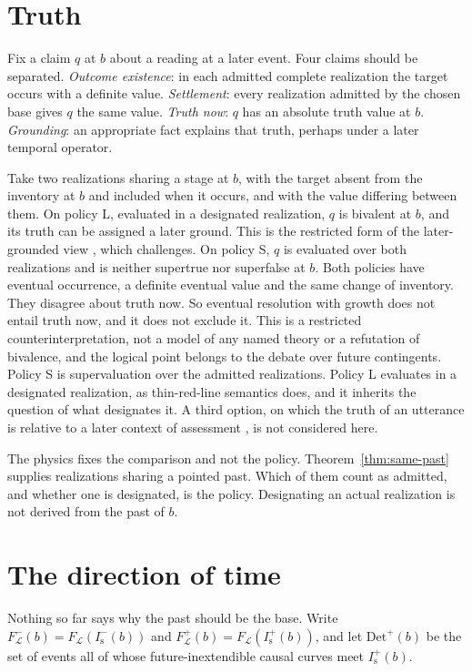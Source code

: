 \documentclass[11pt]{article}
\theoremstyle{definition}
\newcommand{\Is}{I^-_{\mathrm s}}
\newcommand{\Isp}{I^+_{\mathrm s}}
\newcommand{\Det}{\mathrm{Det}}
\begin{document}
\section{Truth}\label{sec:truth}

Fix a claim $q$ at $b$ about a reading at a later event. Four claims should be separated. \emph{Outcome
existence}: in each admitted complete realization the target occurs with a definite value.
\emph{Settlement}: every realization admitted by the chosen base gives $q$ the same value. \emph{Truth now}:
$q$ has an absolute truth value at $b$. \emph{Grounding}: an appropriate fact explains that truth, perhaps
under a later temporal operator.

Take two realizations sharing a stage at $b$, with the target absent from the inventory at $b$ and included
when it occurs, and with the value differing between them. On policy L, evaluated in a designated realization,
$q$ is bivalent at $b$, and its truth can be assigned a later ground. This is the restricted form of the later-grounded view \citep{CR2018}, which \citet{Wawer2021} challenges. On policy S, $q$ is evaluated over both realizations and is neither
supertrue nor superfalse at $b$. Both policies have eventual occurrence, a definite eventual value and the
same change of inventory. They disagree about truth now. So eventual resolution with growth does not entail
truth now, and it does not exclude it. This is a restricted counterinterpretation, not a model of any named
theory or a refutation of bivalence, and the logical point belongs to the debate over future contingents. Policy S is supervaluation over the
admitted realizations. Policy L evaluates in a designated realization, as thin-red-line semantics does, and it
inherits the question of what designates it. A third option, on which the truth of an utterance is relative to
a later context of assessment \citep{MacFarlane2003}, is not considered here.

The physics fixes the comparison and not the policy. Theorem~\ref{thm:same-past} supplies realizations sharing a
pointed past. Which of them count as admitted, and whether one is designated, is the policy. Designating an
actual realization is not derived from the past of $b$.

\section{The direction of time}\label{sec:direction}

Nothing so far says why the past should be the base. Write $F^-_{\mathcal L}(b)=F_{\mathcal L}(\Is(b))$ and $F^+_{\mathcal L}(b)=F_{\mathcal L}(\Isp(b))$, and let $\Det^+(b)$ be the set of events all of whose future-inextendible causal curves meet $\Isp(b)$.
\end{document}
